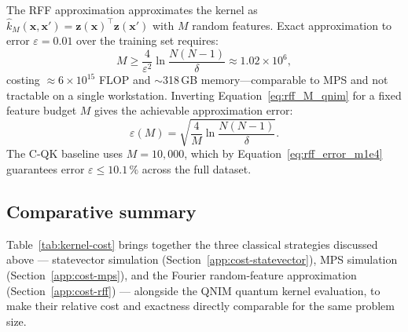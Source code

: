 \documentclass[11pt,a4paper, english]{book}
\theoremstyle{plain}
\theoremstyle{definition}
\numberwithin{equation}{chapter}
\numberwithin{figure}{chapter}
\numberwithin{table}{chapter}
\begin{document}
The RFF approximation \cite{Rahimi_2007} approximates the kernel as
$\hat{k}_M(\mathbf{x},\mathbf{x}')=\mathbf{z}(\mathbf{x})^\top
\mathbf{z}(\mathbf{x}')$ with $M$ random features. Exact approximation
to error $\varepsilon=0.01$ over the training set requires:
\begin{equation}
  \label{eq:rff_M_qnim}
  M \geq \frac{4}{\varepsilon^2}\ln\frac{N(N-1)}{\delta}
    \approx 1.02\times10^6,
\end{equation}
costing $\approx6\times10^{15}$ FLOP and $\sim$318\,GB memory---comparable to
MPS and not tractable on a single workstation. Inverting
Equation~\eqref{eq:rff_M_qnim} for a fixed feature budget $M$ gives the
achievable approximation error:
\begin{equation}
  \label{eq:rff_error_m1e4}
  \varepsilon(M) = \sqrt{\frac{4}{M}\ln\frac{N(N-1)}{\delta}}.
\end{equation}
The C-QK baseline uses $M=10{,}000$, which by
Equation~\eqref{eq:rff_error_m1e4} guarantees error $\varepsilon\leq10.1\,\%$
across the full dataset.

\subsection{Comparative summary}
\label{app:cost-summary}

Table~\ref{tab:kernel-cost} brings together the three classical
strategies discussed above --- statevector simulation
(Section~\ref{app:cost-statevector}), MPS simulation
(Section~\ref{app:cost-mps}), and the Fourier random-feature
approximation (Section~\ref{app:cost-rff}) --- alongside the QNIM
quantum kernel evaluation, to make their relative cost and exactness
directly comparable for the same problem size.


\begin{table}[H]
\centering
\small
{}
\caption[Cost comparison of classical kernel strategies]{Cost comparison of three classical strategies for computing
         the QNIM quantum kernel ($N=78{,}000$, $n=12$, $r_\phi=2$). Source: own elaboration.}
\label{tab:kernel-cost}
\vspace{2pt}
\end{table}
\end{document}
